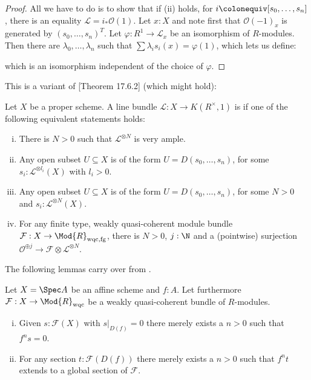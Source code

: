 \begin{proof}
  All we have to do is to show that if (ii) holds, for $i\colonequiv [s_0,\dots,s_n]$,
  there is an equality $\mathcal L=i_\ast \mathcal O(1)$.
  Let $x:X$ and note first that $\mathcal O(-1)_x$ is generated by $(s_0,\dots,s_n)^T$.
  Let $\varphi:R^1\to \mathcal L_x$ be an isomorphism of $R$-modules.
  Then there are $\lambda_0,\dots,\lambda_n$ such that $\sum \lambda_i s_i(x) =\varphi(1)$,
  which lets us define:
  \begin{center}
  \end{center}
  which is an isomorphism independent of the choice of $\varphi$.
\end{proof}

This is a variant of \cite{vakil}[Theorem 17.6.2] (which might hold):

\begin{definition}
  Let $X$ be a proper scheme.
  A line bundle $\mathcal L : X\to K(R^\times,1)$ is 
  if one of the following equivalent statements holds:
  \begin{enumerate}[(i)]
  \item There is $N>0$ such that $\mathcal L^{\otimes N}$ is very ample.
  \item Any open subset $U\subseteq X$ is of the form $U=D(s_0,\dots,s_n)$,
    for some $s_i:\mathcal L^{\otimes l_i}(X)$ with $l_i>0$.
  \item Any open subset $U\subseteq X$ is of the form $U=D(s_0,\dots,s_n)$,
    for some $N>0$ and $s_i:\mathcal L^{\otimes N}(X)$.
  \item For any finite type, weakly quasi-coherent module bundle $\mathcal F:X\to \Mod{R}_{\mathrm{wqc,fg}}$,
    there is $N>0$, $j:\N$ and a (pointwise) surjection
    $\mathcal O^{\oplus j}\to \mathcal F\otimes \mathcal L^{\otimes N}$.
  \end{enumerate}
\end{definition}

The following lemmas carry over from \cite[Chapter II.5]{Hartshorne}.

\begin{lemma}
  Let $X = \Spec A$ be an affine scheme and $f:A$.
  Let furthermore $\mathcal F:X\to \Mod{R}_{\mathrm{wqc}}$ be a weakly quasi-coherent bundle of $R$-modules.
  \begin{enumerate}[(i)]
    \item Given $s:\mathcal F(X)$ with $s|_{D(f)} = 0$  there merely exists a $n>0$ such that $f^ns=0$.
    \item For any section $t:\mathcal F (D(f))$ there merely exists a $n>0$
      such that $f^nt$ extends to a global section of $\mathcal F$.
  \end{enumerate}
\end{lemma}

